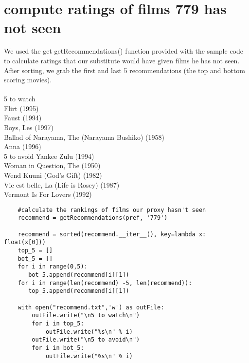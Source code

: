 \documentclass[11pt]{article}
\begin{document}
	\section{compute ratings of films 779 has not seen}
	We used the get getRecommendations() function provided with the sample code to calculate ratings that our substitute would have given films he has not seen. After sorting, we grab the first and last 5 recommendations (the top and bottom scoring movies). \\ \\
	5 to watch \\
	Flirt (1995)  \\
	Faust (1994) \\
	Boys, Les (1997) \\
	Ballad of Narayama, The (Narayama Bushiko) (1958) \\
	Anna (1996) \\
	
	5 to avoid
	Yankee Zulu (1994) \\
	Woman in Question, The (1950) \\
	Wend Kuuni (God's Gift) (1982) \\
	Vie est belle, La (Life is Rosey) (1987) \\
	Vermont Is For Lovers (1992) \\
	\begin{lstlisting}
	#calculate the rankings of films our proxy hasn't seen
	recommend = getRecommendations(pref, '779')
	
	recommend = sorted(recommend.__iter__(), key=lambda x: float(x[0]))
	top_5 = []
	bot_5 = []
	for i in range(0,5):
	   bot_5.append(recommend[i][1])
	for i in range(len(recommend) -5, len(recommend)):
	   top_5.append(recommend[i][1])
	
	with open("recommend.txt",'w') as outFile:
	    outFile.write("\n5 to watch\n")
	    for i in top_5:
	        outFile.write("%s\n" % i)
	    outFile.write("\n5 to avoid\n")
	    for i in bot_5:
	        outFile.write("%s\n" % i)
	\end{lstlisting}
\end{document}
